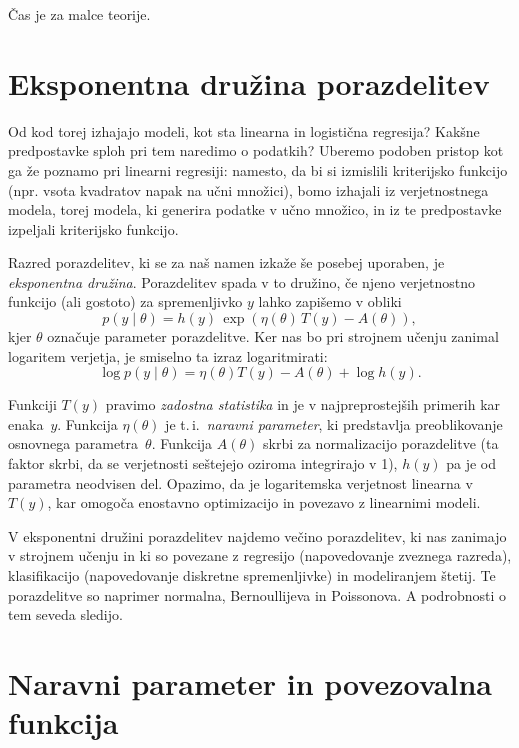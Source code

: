 Čas je za malce teorije.

\section{Eksponentna družina porazdelitev}

Od kod torej izhajajo modeli, kot sta linearna in logistična regresija? Kakšne predpostavke sploh pri tem naredimo o podatkih? Uberemo podoben pristop kot ga že poznamo pri linearni regresiji: namesto, da bi si izmislili kriterijsko funkcijo (npr. vsota kvadratov napak na učni množici), bomo izhajali iz verjetnostnega modela, torej modela, ki generira podatke v učno množico, in iz te predpostavke izpeljali kriterijsko funkcijo.

Razred porazdelitev, ki se za naš namen izkaže še posebej uporaben, je \emph{eksponentna družina}. Porazdelitev spada v to družino, če njeno verjetnostno funkcijo (ali gostoto) za spremenljivko $y$ lahko zapišemo v obliki
\[
p(y \mid \theta) = h(y)\,\exp\left(\eta(\theta)\,T(y) - A(\theta)\right),
\]
kjer $\theta$ označuje parameter porazdelitve. Ker nas bo pri strojnem učenju zanimal logaritem verjetja, je smiselno ta izraz logaritmirati:
\[
\log p(y \mid \theta) = \eta(\theta) T(y) - A(\theta) + \log h(y).
\]

Funkciji $T(y)$ pravimo {\em zadostna statistika} in je v najpreprostejših primerih kar enaka~$y$. Funkcija $\eta(\theta)$ je t.\,i.\ {\em naravni parameter}, ki predstavlja preoblikovanje osnovnega parametra~$\theta$. Funkcija $A(\theta)$ skrbi za normalizacijo porazdelitve (ta faktor skrbi, da se verjetnosti seštejejo oziroma integrirajo v 1), $h(y)$ pa je od parametra neodvisen del. Opazimo, da je logaritemska verjetnost linearna v $T(y)$, kar omogoča enostavno optimizacijo in povezavo z linearnimi modeli.

V eksponentni družini porazdelitev najdemo večino porazdelitev, ki nas zanimajo v strojnem učenju in ki so povezane z regresijo (napovedovanje zveznega razreda), klasifikacijo (napovedovanje diskretne spremenljivke) in modeliranjem štetij. Te porazdelitve so naprimer normalna, Bernoullijeva in Poissonova. A podrobnosti o tem seveda sledijo. 

\section{Naravni parameter in povezovalna funkcija}

